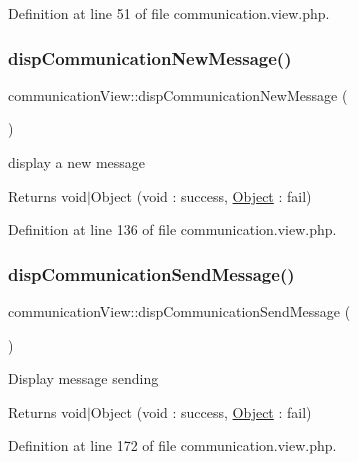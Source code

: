 Definition at line 51 of file communication.\+view.\+php.

\mbox{\label{classcommunicationView_a3f0afc676b2ea9ee123f86fc362aeb19}} 
\subsubsection{\texorpdfstring{disp\+Communication\+New\+Message()}{dispCommunicationNewMessage()}}
{\footnotesize\ttfamily communication\+View\+::disp\+Communication\+New\+Message (\begin{DoxyParamCaption}{ }\end{DoxyParamCaption})}

display a new message \begin{DoxyReturn}{Returns}
void$\vert$\+Object (void \+: success, \hyperlink{classObject}{Object} \+: fail) 
\end{DoxyReturn}


Definition at line 136 of file communication.\+view.\+php.

\mbox{\label{classcommunicationView_a7c9525d8c0851708e5b768df15e61bf6}} 
\subsubsection{\texorpdfstring{disp\+Communication\+Send\+Message()}{dispCommunicationSendMessage()}}
{\footnotesize\ttfamily communication\+View\+::disp\+Communication\+Send\+Message (\begin{DoxyParamCaption}{ }\end{DoxyParamCaption})}

Display message sending \begin{DoxyReturn}{Returns}
void$\vert$\+Object (void \+: success, \hyperlink{classObject}{Object} \+: fail) 
\end{DoxyReturn}


Definition at line 172 of file communication.\+view.\+php.

